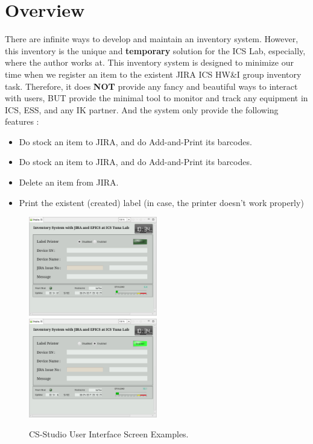 \documentclass[11pt
  , a4paper
  , article
  , oneside
  , showtrims
]{memoir}
\begin{document}
\chapter{Overview}
There are infinite ways to develop and maintain an inventory system. However, this inventory is the unique and \textbf{temporary} solution for the ICS Lab, especially, where the author works at. This inventory system is designed to minimize our time when we register an item to the existent JIRA ICS HW\&I group inventory task. Therefore, it does \textbf{NOT} provide any fancy and beautiful ways to interact with users, BUT provide the minimal tool to monitor and track any equipment in ICS, ESS, and any IK partner. And the system only provide the following features :
\begin{itemize}
\item Do stock an item to JIRA, and do Add-and-Print its barcodes.
\item Do stock an item to JIRA, and do Add-and-Print its barcodes.
\item Delete an item from JIRA.
\item Print the existent (created) label (in case, the printer doesn't work properly)
\end{itemize}


\begin{figure}[!htb]
  \includegraphics[width=0.5\textwidth]{./pictures/inv01.eps}
  \includegraphics[width=0.5\textwidth]{./pictures/inv02.eps}
  \caption{
            CS-Studio User Interface Screen Examples.
          }
  \label{fig:css-examples}   
\end{figure}
\end{document}
